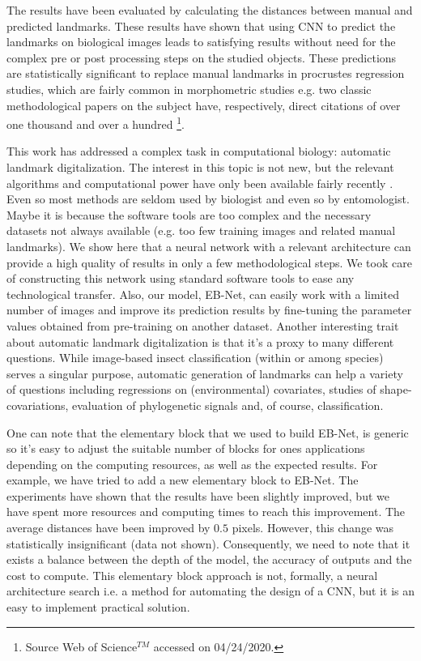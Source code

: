 \documentclass[review]{elsarticle}
\begin{document}
The results have been evaluated by calculating the distances between manual and predicted landmarks. These results have shown that using CNN to predict the landmarks on biological images leads to satisfying results without need for the complex pre or post processing steps on the studied objects. These predictions are statistically significant to replace manual landmarks in procrustes regression studies, which are fairly common in morphometric studies e.g. two classic methodological papers on the subject\cite{goodall_procrustes_1991,collyer_method_2015} have, respectively, direct citations of over one thousand and over a hundred \footnote{Source Web of Science$^{TM}$ accessed on 04/24/2020.}.

This work has addressed a complex task in computational biology: automatic landmark digitalization. The interest in this topic is not new, but the relevant algorithms and computational power have only been available fairly recently \cite{palaniswamy_automatic_2010, cintas_automatic_2017, vandaele_landmark_2018,dai_locating_2019}. Even so  most methods are seldom used by biologist and even so by entomologist. 
Maybe it is because the software tools are too complex and the necessary datasets not always available (e.g. too few training images and related manual landmarks).
We show here that a neural network with a relevant architecture can provide a high quality of results in only a few methodological steps. We took care of constructing this network using standard software tools to ease any technological transfer. Also, our model, EB-Net, can easily work with a limited number of images and improve its prediction results by fine-tuning the parameter values obtained from pre-training on another dataset. Another interesting trait about automatic landmark digitalization is that it's a proxy to many different questions. While image-based insect classification (within or among species) \cite{martineau_survey_2017} serves a singular purpose, automatic generation of landmarks can help a variety of questions including regressions on (environmental) covariates, studies of shape-covariations, evaluation of phylogenetic signals and, of course, classification.

One can note that the elementary block that we used to build EB-Net, is generic so it's easy to adjust the suitable number of blocks for ones applications depending on the computing resources, as well as the expected results. For example, we have tried to add a new elementary block to EB-Net. The experiments have shown that the results have been slightly improved, but we have spent more resources and computing times to reach this improvement. The average distances have been improved by $0.5$ pixels. However, this change was statistically insignificant (data not shown). Consequently, we need to note that it exists a balance between the depth of the model, the accuracy of outputs and the cost to compute.
This elementary block approach is not, formally, a  neural architecture search \cite{elsken_neural_2019} i.e. a method for automating the design of a CNN,  but it is an easy to implement practical solution.
\end{document}
